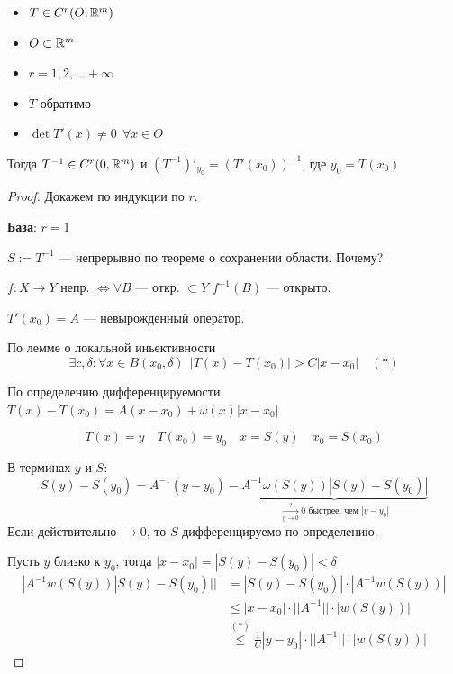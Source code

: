 \begin{theorem}\itemfix
    \begin{itemize}
        \item $T \in C^r(O, \mathbb{R}^m)$
        \item $O\subset\mathbb{R}^m$
        \item $r = 1, 2, \ldots +\infty$
        \item $T$ обратимо
        \item $\det T'(x) \not=0 \ \ \forall x\in O$
    \end{itemize}
    Тогда $T^{-1} \in C^r(0, \mathbb{R}^m)$ и $(T^{-1})'_{y_0} = (T'(x_0))^{-1}$, где $y_0 = T(x_0)$
\end{theorem}
\begin{proof}
    Докажем по индукции по $r$.

    \textbf{База}: $r = 1$

    $S := T^{-1}$ --- непрерывно по теореме о сохранении области. Почему?

    $f : X \to Y$ непр. $\Leftrightarrow \forall B$ --- откр. $\subset Y$ $f^{-1}(B)$ --- открыто.

    $T'(x_0) = A$ --- невырожденный оператор.

    По лемме о локальной иньективности
    $$\exists c, \delta : \forall x\in B(x_0, \delta) \ \ |T(x) - T(x_0)| > C|x-x_0| \quad (*)$$

    По определению дифференцируемости $T(x) - T(x_0) = A(x-x_0) + \omega(x)|x-x_0|$

    $$T(x) = y \quad T(x_0) = y_0 \quad x = S(y) \quad x_0 = S(x_0)$$

    В терминах $y$ и $S$:
    $$S(y) - S(y_0) = A^{-1}(y-y_0) - \underbrace{A^{-1}\omega(S(y))|S(y)-S(y_0)|}_{\xrightarrow[y\to0]{?}0 \text{ быстрее, чем } |y-y_0|}$$
    Если действительно $\to0$, то $S$ дифференцируемо по определению.

    Пусть $y$ близко к $y_0$, тогда $|x-x_0| = |S(y) - S(y_0)| < \delta$
    \begin{align*}
        |A^{-1}w(S(y))|S(y) - S(y_0)|| & = |S(y) - S(y_0)|\cdot|A^{-1}w(S(y))|                                    \\
                                       & \le |x-x_0| \cdot ||A^{-1}|| \cdot |w(S(y))|                             \\
                                       & \stackrel{(*)}{\le} \frac{1}{C}|y - y_0|\cdot ||A^{-1}|| \cdot |w(S(y))|
    \end{align*}


\end{proof}
